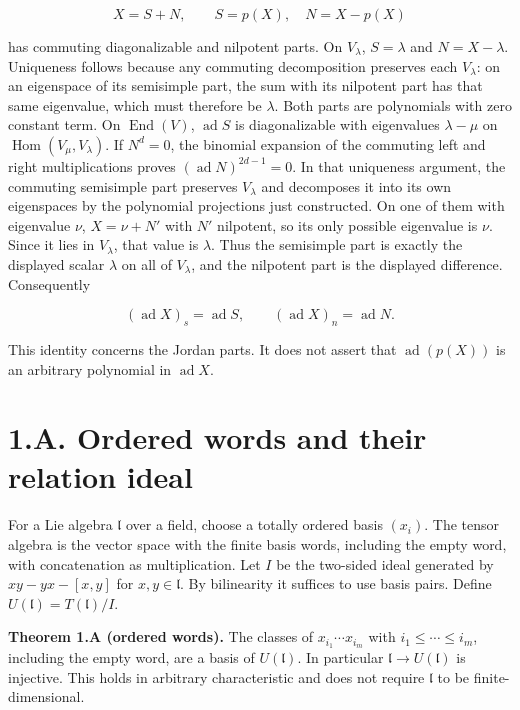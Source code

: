 \documentclass[11pt,a4paper,openany]{report}
\begin{document}
\[
X=S+N,\qquad S=p(X),\quad N=X-p(X)
\tag{1.2}
\]

has commuting diagonalizable and nilpotent parts. On \(V_\lambda\), \(S=\lambda\) and \(N=X-\lambda\). Uniqueness follows because any commuting decomposition preserves each \(V_\lambda\): on an eigenspace of its semisimple part, the sum with its nilpotent part has that same eigenvalue, which must therefore be \(\lambda\). Both parts are polynomials with zero constant term. On \(\operatorname{End}(V)\), \(\operatorname{ad}S\) is diagonalizable with eigenvalues \(\lambda-\mu\) on \(\operatorname{Hom}(V_\mu,V_\lambda)\). If \(N^d=0\), the binomial expansion of the commuting left and right multiplications proves \((\operatorname{ad}N)^{2d-1}=0\). In that uniqueness argument, the commuting semisimple part preserves \(V_\lambda\) and decomposes it into its own eigenspaces by the polynomial projections just constructed. On one of them with eigenvalue \(\nu\), \(X=\nu+N'\) with \(N'\) nilpotent, so its only possible eigenvalue is \(\nu\). Since it lies in \(V_\lambda\), that value is \(\lambda\). Thus the semisimple part is exactly the displayed scalar \(\lambda\) on all of \(V_\lambda\), and the nilpotent part is the displayed difference. Consequently

\[
(\operatorname{ad}X)_s=\operatorname{ad}S,
\qquad (\operatorname{ad}X)_n=\operatorname{ad}N.
\tag{1.3}
\]

This identity concerns the Jordan parts. It does not assert that \(\operatorname{ad}(p(X))\) is an arbitrary polynomial in \(\operatorname{ad}X\).

\section{1.A. Ordered words and their relation ideal}\label{AG-RG-S06-a.-ordered-words-and-their-relation-ideal}

For a Lie algebra \(\mathfrak l\) over a field, choose a totally ordered basis \((x_i)\). The tensor algebra is the vector space with the finite basis words, including the empty word, with concatenation as multiplication. Let \(I\) be the two-sided ideal generated by \(xy-yx-[x,y]\) for \(x,y\in\mathfrak l\). By bilinearity it suffices to use basis pairs. Define \(U(\mathfrak l)=T(\mathfrak l)/I\).

\textbf{Theorem 1.A (ordered words).} The classes of \(x_{i_1}\cdots x_{i_m}\) with \(i_1\le\cdots\le i_m\), including the empty word, are a basis of \(U(\mathfrak l)\). In particular \(\mathfrak l\to U(\mathfrak l)\) is injective. This holds in arbitrary characteristic and does not require \(\mathfrak l\) to be finite-dimensional.
\end{document}
